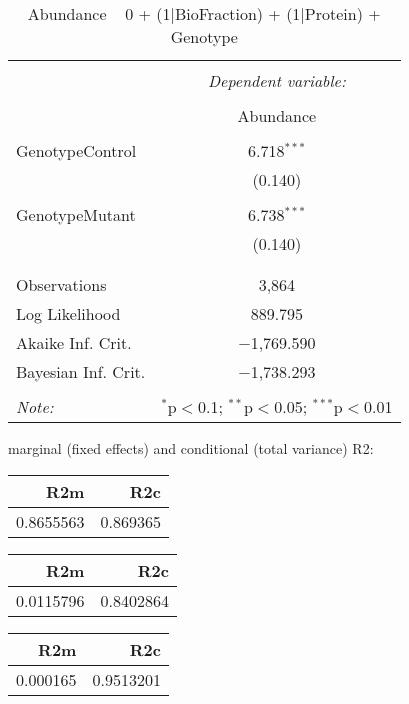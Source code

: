 \documentclass[11pt]{report}
\begin{document}
\begin{table}[!htbp] \centering 
  \caption{Abundance ~ 0 + (1|BioFraction) + (1|Protein) + Genotype} 
  \label{} 
\begin{tabular}{@{\extracolsep{5pt}}lc} 
\\[-1.8ex]\hline 
\hline \\[-1.8ex] 
 & \multicolumn{1}{c}{\textit{Dependent variable:}} \\ 
\cline{2-2} 
\\[-1.8ex] & Abundance \\ 
\hline \\[-1.8ex] 
 GenotypeControl & 6.718$^{***}$ \\ 
  & (0.140) \\ 
  & \\ 
 GenotypeMutant & 6.738$^{***}$ \\ 
  & (0.140) \\ 
  & \\ 
\hline \\[-1.8ex] 
Observations & 3,864 \\ 
Log Likelihood & 889.795 \\ 
Akaike Inf. Crit. & $-$1,769.590 \\ 
Bayesian Inf. Crit. & $-$1,738.293 \\ 
\hline 
\hline \\[-1.8ex] 
\textit{Note:}  & \multicolumn{1}{r}{$^{*}$p$<$0.1; $^{**}$p$<$0.05; $^{***}$p$<$0.01} \\ 
\end{tabular} 
\end{table} 
marginal (fixed effects) and conditional (total variance) R2:

\begin{tabular}{r|r}
\hline
R2m & R2c\\
\hline
0.8655563 & 0.869365\\
\hline
\end{tabular}

\begin{tabular}{r|r}
\hline
R2m & R2c\\
\hline
0.0115796 & 0.8402864\\
\hline
\end{tabular}

\begin{tabular}{r|r}
\hline
R2m & R2c\\
\hline
0.000165 & 0.9513201\\
\hline
\end{tabular}
\end{document}
